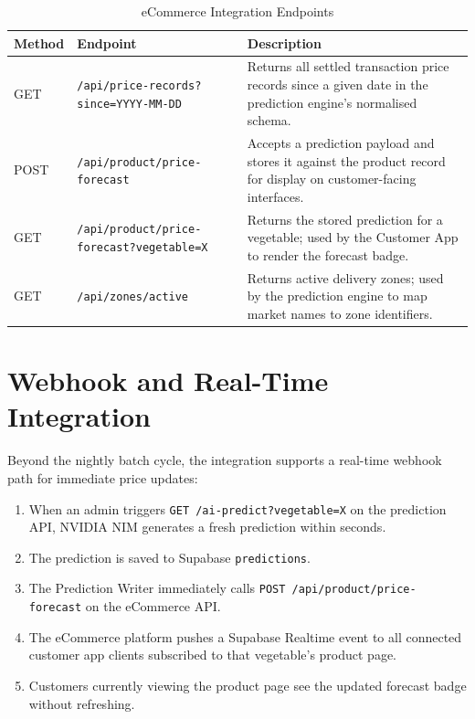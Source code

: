 \documentclass[12pt, a4paper, oneside]{report}
\begin{document}
\begin{table}[H]
\centering
\caption{eCommerce Integration Endpoints}
\label{tab:ec-integration-endpoints}
\begin{tabularx}{\textwidth}{@{} C{1.4cm} L{6.0cm} X @{}}
\toprule
\textbf{Method} & \textbf{Endpoint} & \textbf{Description} \\
\midrule
GET  & \texttt{/api/price-records?since=YYYY-MM-DD}
     & Returns all settled transaction price records since a given date
       in the prediction engine's normalised schema. \\[3pt]
POST & \texttt{/api/product/price-forecast}
     & Accepts a prediction payload and stores it against the product
       record for display on customer-facing interfaces. \\[3pt]
GET  & \texttt{/api/product/price-forecast?vegetable=X}
     & Returns the stored prediction for a vegetable; used by the
       Customer App to render the forecast badge. \\[3pt]
GET  & \texttt{/api/zones/active}
     & Returns active delivery zones; used by the prediction engine
       to map market names to zone identifiers. \\
\bottomrule
\end{tabularx}
\end{table}

\section{Webhook and Real-Time Integration}

Beyond the nightly batch cycle, the integration supports a real-time webhook
path for immediate price updates:

\begin{enumerate}
  \item When an admin triggers \texttt{GET /ai-predict?vegetable=X} on the
        prediction API, NVIDIA NIM generates a fresh prediction within seconds.
  \item The prediction is saved to Supabase \texttt{predictions}.
  \item The Prediction Writer immediately calls
        \texttt{POST /api/product/price-forecast} on the eCommerce API.
  \item The eCommerce platform pushes a Supabase Realtime event to all
        connected customer app clients subscribed to that vegetable's product
        page.
  \item Customers currently viewing the product page see the updated forecast
        badge without refreshing.
\end{enumerate}
\end{document}
